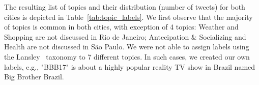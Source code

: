 





The resulting list of topics and their distribution (number of tweets) for both cities is depicted in Table~\ref{tab:topic_labels}. We first observe that the majority of topics is common in both cities, with exception of 4 topics:  Weather and Shopping are not discussed in Rio de Janeiro; Antecipation \& Socializing and Health are not discussed in São Paulo. We were not able to assign labels using the Lansley~\cite{lansley2016geography} taxonomy to 7 different topics. In such cases, we created our own labels, e.g., "BBB17" is about a highly popular reality TV show in Brazil named Big Brother Brazil. 

